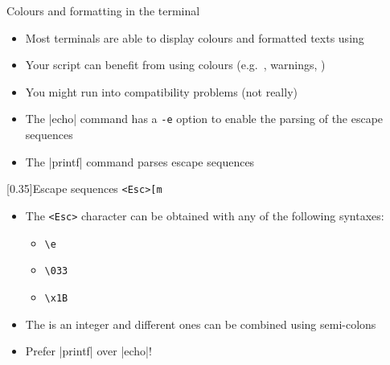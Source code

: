 
\begin{frame}{Colours and formatting in the terminal}{}
    \vspace{-1mm}
    \begin{itemize}
        \item Most terminals are able to display colours and formatted texts using 
        \item Your script can benefit from using colours (e.g.\ , \alert{warnings}, )
        \item You might run into compatibility problems (not really) {\scriptsize $\;$ }
        \item The \bash|echo| command has a \texttt{\alert{-e}} option to enable the parsing of the escape sequences
        \item The \bash|printf| command parses escape sequences
    \end{itemize}
    \vspace{-3mm}
    \begin{varblock}{}[0.35\textwidth]{Escape sequences}
        \texttt{<Esc>[m}
    \end{varblock}
    \begin{itemize}
        \item The \texttt{<Esc>} character can be obtained with any of the following syntaxes:
              \begin{itemize}
                  \item[$\circ$] \texttt{\textbackslash{}e}
                  \item[$\circ$] \texttt{\textbackslash{}033}
                  \item[$\circ$] \texttt{\textbackslash{}x1B}
              \end{itemize}
        \item The \texttt{} is an integer and different ones can be combined using semi-colons
        \item \alert{Prefer \bash|printf| over \bash|echo|!} 
    \end{itemize}
\end{frame}
